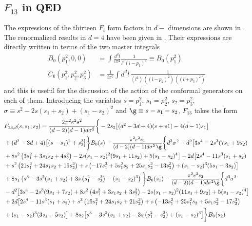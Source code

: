 \documentclass[a4paper,11pt,openright,twoside]{book}
\let\s=\sigma  \let\t=\tau     \let\u=\upsilon \let\f=\phi
\newcommand{\sdfrac}[2]{\mbox{\small$\displaystyle\frac{#1}{#2}$}}
\numberwithin{equation}{section}
\begin{document}
{{\subsection{\texorpdfstring{$F_{13}$}{} in QED}
The expressions of the thirteen $F_i$ form factors in $d-$ dimensions are shown in \cite{Coriano:2018bbe}. The renormalized results in $d=4$ have been given in \cite{Armillis:2009pq}. Their expressions are directly written in terms of the two master integrals   
\begin{align}
	B_0(p_1^2,0,0)&=\int \frac{d^d l}{i\pi^2}\frac{1}{l^2(l-p_1)^2}\equiv B_0(p_1^2)\\
	C_0 (p_1^2, p_2^2, p_3^2) &=
	\frac{1}{i \pi^2} \int d^d l \, \frac{1}{(l^2 ) \, ((l -p_2 )^2  ) \, ((l + p_3 )^2  )} 
\end{align}
and this is useful for the discussion of the action of the conformal generators on each of them. Introducing the variables $s=p_1^2$, $s_1=p_2^2$, $s_2=p_3^2$, $\s\equiv s^2-2s(s_1+s_2)+(s_1-s_2)^2$ and $\g\equiv s-s_1-s_2$, $F_{13}$ takes the form 
\begin{align}
	&F_{13, d}(s,s_1,s_2)=\frac{2 \pi ^2 e^2 s^2}{( d-2) ( d-1)  d \sigma ^2} \bigg\{-2 s_2 \big[( d^2-3 d+4) (s+s1)-4( d-1) s_1\big]\notag\\
	&+( d^2-3 d+4) \big[(s-s_1)^2+s_2^2\big]\bigg\}B_0(s)-\sdfrac{\pi ^2 e^2 s_1}{( d-2) ( d-1)  d \sigma ^2 \,\g} \bigg\{ d^3 \sigma ^2- d^2 \big[3 s^4-2 s^3 (7 s_1+9 s_2)\notag\\
	&+8 s^2 \left(3 s_1^2+3 s_1 s_2+4 s_2^2\right)-2 s (s_1-s_2)^2 (9 s_1+11 s_2)+5 (s_1-s_2)^4\big]+2  d \big[2 s^4-11 s^3 (s_1+s_2)\notag\\
	&+s^2 \left(21 s_1^2+24 s_1 s_2+19 s_2^2\right)+s \left(-17 s_1^3+5 s_1^2 s_2+25 s_1 s_2^2-13 s_2^3\right)+(s_1-s_2)^3 (5 s_1-3 s_2)\big]\notag\\
	&+8 s_1 \left(s^3-3 s^2 (s_1+s_2)+3 s \left(s_1^2-s_2^2\right)-(s_1-s_2)^3\right)\bigg\}B_0(s_1)-\sdfrac{\pi ^2 e^2 s_2}{( d-2) ( d-1)  d \sigma ^2\g} \bigg\{ d^3 \sigma ^2\notag\\
	&- d^2 \big[3 s^4-2 s^3 (9 s_1+7 s_2)+8 s^2 \left(4 s_1^2+3 s_1 s_2+3 s_2^2\right)-2 s (s_1-s_2)^2 (11 s_1+9 s_2)+5 (s_1-s_2)^4\big]\notag\\
	&+2  d \big[2 s^4-11 s^3 (s_1+s_2)+s^2 \left(19 s_1^2+24 s_1 s_2+21 s_2^2\right)+s \left(-13 s_1^3+25 s_1^2 s_2+5 s_1 s_2^2-17 s_2^3\right)\notag\\
	&+(s_1-s_2)^3 (3 s_1-5 s_2)\big]+8 s_2 \big[s^3-3 s^2 (s_1+s_2)-3 s \left(s_1^2-s_2^2\right)+(s_1-s_2)^3\big]\bigg\}B_0(s_2)\notag\\

\end{align}}}
\end{document}
